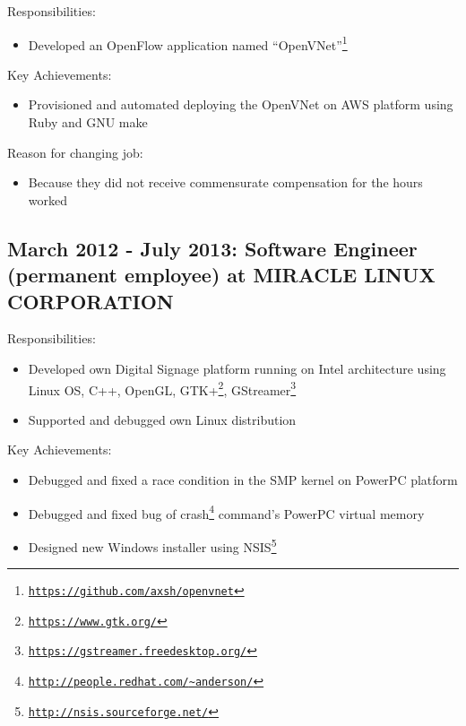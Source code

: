 \documentclass[letterpaper]{article}
\begin{document}
\noindent Responsibilities:

\begin{itemize}
  \item Developed an OpenFlow application named ``OpenVNet''\footnote{\href{https://github.com/axsh/openvnet}{\tt https://github.com/axsh/openvnet}}
\end{itemize}

\noindent Key Achievements:

\begin{itemize}
  \item Provisioned and automated deploying the OpenVNet on AWS platform using Ruby and GNU make
\end{itemize}

\noindent Reason for changing job:

\begin{itemize}
  \item Because they did not receive commensurate compensation for the hours worked
\end{itemize}

\subsection*{March 2012 - July 2013: Software Engineer (permanent employee) at MIRACLE LINUX CORPORATION}

\noindent Responsibilities:

\begin{itemize}
  \item Developed own Digital Signage platform running on Intel architecture using Linux OS, C++, OpenGL, GTK+\footnote{\href{https://www.gtk.org/}{\tt https://www.gtk.org/}}, GStreamer\footnote{\href{https://gstreamer.freedesktop.org/}{\tt https://gstreamer.freedesktop.org/}}
  \item Supported and debugged own Linux distribution
\end{itemize}

\noindent Key Achievements:

\begin{itemize}
  \item Debugged and fixed a race condition in the SMP kernel on PowerPC platform
  \item Debugged and fixed bug of crash\footnote{\href{http://people.redhat.com/{\textasciitilde}anderson/}{\tt http://people.redhat.com/{\textasciitilde}anderson/}} command's PowerPC virtual memory
  \item Designed new Windows installer using NSIS\footnote{\href{http://nsis.sourceforge.net/}{\tt http://nsis.sourceforge.net/}}
\end{itemize}
\end{document}
